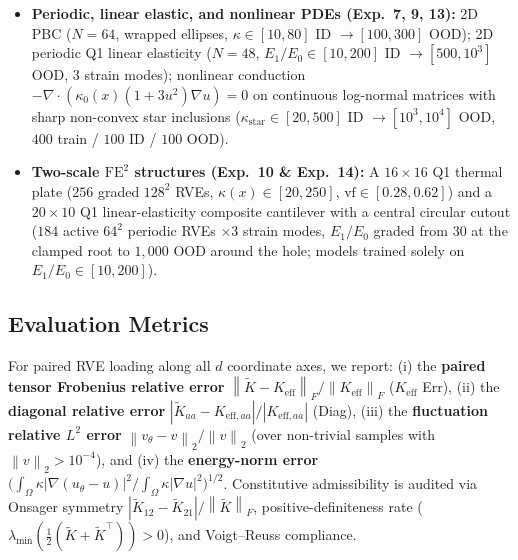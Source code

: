 \documentclass[preprint,11pt]{elsarticle}
\newcommand{\Keff}{K_{\mathrm{eff}}}
\newcommand{\Keffij}[1]{K_{\mathrm{eff},#1}}
\newcommand{\norm}[1]{\left\lVert #1 \right\rVert}
\newcommand{\abs}[1]{\left\lvert #1 \right\rvert}
\begin{document}
\begin{itemize}
  \item \textbf{Periodic, linear elastic, and nonlinear PDEs (Exp.~7, 9, 13):} 2D PBC ($N=64$, wrapped ellipses, $\kappa \in [10, 80]$ ID $\to [100, 300]$ OOD); 2D periodic Q1 linear elasticity ($N=48$, $E_1/E_0 \in [10, 200]$ ID $\to [500, 10^3]$ OOD, 3 strain modes); nonlinear conduction $-\nabla\cdot(\kappa_0(x)(1+3u^2)\nabla u)=0$ on continuous log-normal matrices with sharp non-convex star inclusions ($\kappa_{\mathrm{star}} \in [20, 500]$ ID $\to [10^3, 10^4]$ OOD, $400$ train / $100$ ID / $100$ OOD).
  \item \textbf{Two-scale $\mathrm{FE}^2$ structures (Exp.~10 \& Exp.~14):} A $16\times 16$ Q1 thermal plate ($256$ graded $128^2$ RVEs, $\kappa(x) \in [20, 250]$, $\mathrm{vf} \in [0.28, 0.62]$) and a $20\times 10$ Q1 linear-elasticity composite cantilever with a central circular cutout ($184$ active $64^2$ periodic RVEs $\times 3$ strain modes, $E_1/E_0$ graded from $30$ at the clamped root to $1{,}000$ OOD around the hole; models trained solely on $E_1/E_0 \in [10, 200]$).
\end{itemize}

\subsection{Evaluation Metrics}
For paired RVE loading along all $d$ coordinate axes, we report: (i) the \textbf{paired tensor Frobenius relative error} $\norm{\tilde K - \Keff}_F / \norm{\Keff}_F$ ($\Keff$ Err), (ii) the \textbf{diagonal relative error} $\abs{\tilde K_{aa} - \Keffij{aa}} / \abs{\Keffij{aa}}$ (Diag), (iii) the \textbf{fluctuation relative $L^2$ error} $\norm{v_\theta - v}_2 / \norm{v}_2$ (over non-trivial samples with $\norm{v}_2 > 10^{-4}$), and (iv) the \textbf{energy-norm error} $\big(\int_\Omega \kappa \abs{\nabla(u_\theta - u)}^2 / \int_\Omega \kappa \abs{\nabla u}^2\big)^{1/2}$. Constitutive admissibility is audited via Onsager symmetry $\abs{\tilde K_{12}-\tilde K_{21}}/\norm{\tilde K}_F$, positive-definiteness rate ($\lambda_{\min}(\tfrac{1}{2}(\tilde K+\tilde K^\top)) > 0$), and Voigt--Reuss compliance.
\end{document}
